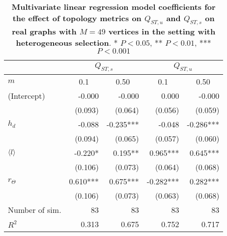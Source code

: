 \begin{table}[ht]
  \centering
    \begin{tabular}{|l|r|r|r|r|}
    \hline
    &       \multicolumn{2}{c|}{$Q_{ST,s}$}                           &               \multicolumn{2}{c|}{$Q_{ST,u}$}        \\ 
\hline
$m$            & \multicolumn{1}{c|}{0.1} & \multicolumn{1}{c|}{0.50} & \multicolumn{1}{c|}{0.1} & \multicolumn{1}{c|}{0.50} \\ 
    \hline
(Intercept) &                  -0.000 &                   -0.000 &                    0.000 &                   -0.000 \\ 
            &                 (0.093) &                  (0.064) &                  (0.056) &                  (0.059) \\ 
$h_d$       &                  -0.088 &                -0.235*** &                   -0.048 &                -0.286*** \\ 
            &                 (0.094) &                  (0.065) &                  (0.057) &                  (0.060) \\ 
$\langle l \rangle$        &                 -0.220* &                  0.195** &                 0.965*** &                 0.645*** \\ 
            &                 (0.106) &                  (0.073) &                  (0.064) &                  (0.068) \\ 
$r_\Theta$  &                0.610*** &                 0.675*** &                -0.282*** &                 0.282*** \\ 
            &                 (0.106) &                  (0.073) &                  (0.063) &                  (0.068) \\ 
\hline
Number of sim.&                    83 &                       83 &                       83 &                       83 \\ 
$R^2$       &                   0.313 &                    0.675 &                    0.752 &                    0.717 \\ 
    \hline 
  \end{tabular}
  \caption{\textbf{Multivariate linear regression model coefficients for the effect of topology metrics on $Q_{ST,u}$ and $Q_{ST,s}$ on real graphs with $M=49$ vertices in the setting with heterogeneous selection}. * $P < 0.05$,  ** $P < 0.01$, *** $P < 0.001$}
\label{tableSI:coefficients_realgraphs}
\end{table}


